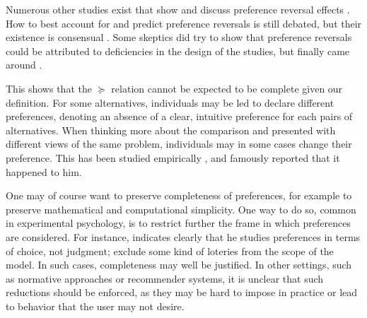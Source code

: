 \documentclass[version=last, pagesize, twocolumn, twoside=off, bibliography=totoc, 12pt, a4paper, english]{scrartcl}
\begin{document}
Numerous other studies exist that show and discuss preference reversal effects \citetext{\citealp[Ch. 2 (from which we took the two studies described here above)]{deparis_etude_2012}, \citealp{lichtenstein_construction_2006, tversky_causes_1990, kahneman_judgement_1981, kahneman_choices_2000}}. How to best account for and predict preference reversals is still debated, but their existence is consensual \citep{wakker_prospect_2010, birnbaum_empirical_2017}. Some skeptics did try to show that preference reversals could be attributed to deficiencies in the design of the studies, but finally came around \citep{slovic_preference_1983}.
	
This shows that the $\succeq$ relation cannot be expected to be complete given our definition. For some alternatives, individuals may be led to declare different preferences, denoting an absence of a clear, intuitive preference for each pairs of alternatives. When thinking more about the comparison and presented with different views of the same problem, individuals may in some cases change their preference. This has been studied empirically \citep{slovic_who_1974, maccrimmon_utility_1979, lichtenstein_reversals_2006}, and \citet[pp. 101–103]{savage_foundations_1972} famously reported that it happened to him.

One may of course want to preserve completeness of preferences, for example to preserve mathematical and computational simplicity. One way to do so, common in experimental psychology, is to restrict further the frame in which preferences are considered. For instance, \citet{luce_utility_2000} indicates clearly that he studies preferences in terms of choice, not judgment; \citet{maccrimmon_real_1980} exclude some kind of loteries from the scope of the model. In such cases, completeness may well be justified. 
In other settings, such as normative approaches or recommender systems, it is unclear that such reductions should be enforced, as they may be hard to impose in practice or lead to behavior that the user may not desire. 
	
\end{document}
